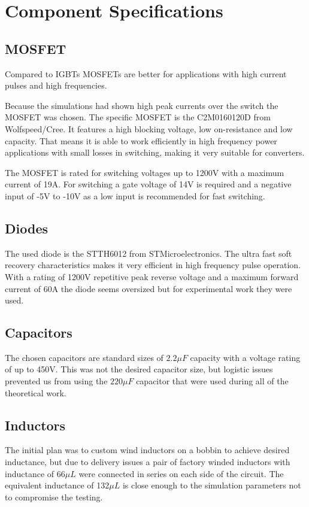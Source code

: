 \vspace{-8mm}
\section{Component Specifications}\label{ch:compSpec}
\vspace{-2mm}
\subsection{MOSFET}
\vspace{-2mm}
Compared to IGBTs MOSFETs are better for applications with high current pulses and high frequencies.\cite{igbtelec63:online}

Because the simulations had shown high peak currents over the switch the MOSFET was chosen.
The specific MOSFET is the C2M0160120D from Wolfspeed/Cree. 
It features a high blocking voltage, low on-resistance and low capacity.
That means it is able to work efficiently in high frequency power applications with small losses in switching, making it very suitable for converters.

The MOSFET is rated for switching voltages up to 1200V with a maximum current of 19A.
For switching a gate voltage of 14V is required and a negative input of -5V to -10V as a low input is recommended for fast switching.\cite{CreeC2M082:online}
\vspace{-4mm}
\subsection{Diodes}
\vspace{-2mm}
The used diode is the STTH6012 from STMicroelectronics.
The ultra fast soft recovery characteristics makes it very efficient in high frequency pulse operation.
With a rating of 1200V repetitive peak reverse voltage and a maximum forward current of 60A the diode seems oversized but for experimental work they were used.\cite{ST}
\vspace{-4mm}
\subsection{Capacitors}
\vspace{-2mm}
The chosen capacitors are standard sizes of $2.2 \mu F$ capacity with a voltage rating of up to 450V. This was not the desired capacitor size, but logistic issues prevented us from using the $220 \mu F$ capacitor that were used during all of the theoretical work.
\vspace{-4mm}
\subsection{Inductors}
The initial plan was to custom wind inductors on a bobbin to achieve desired inductance, but due to delivery issues a pair of factory winded inductors with inductance of 66$\mu L$ were connected in series on each side of the circuit. The equivalent inductance of 132$\mu L$ is close enough to the simulation parameters not to compromise the testing.